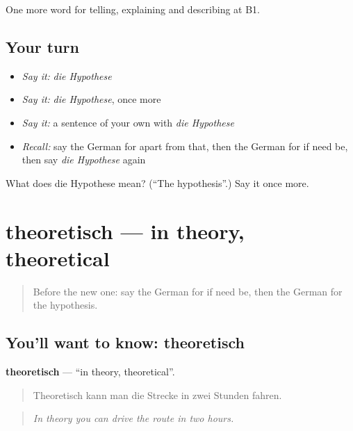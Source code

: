 \begin{grammarlens}[title={What you've built}]
One more word for telling, explaining and describing at B1.
\end{grammarlens}

\subsection*{Your turn}
\begin{itemize}
\raggedright
  \item \emph{Say it:} \emph{die Hypothese}
  \item \emph{Say it:} \emph{die Hypothese}, once more
  \item \emph{Say it:} a sentence of your own with \emph{die Hypothese}
  \item \emph{Recall:} say the German for apart from that, then the German for if need be, then say \emph{die Hypothese} again
\end{itemize}

\begin{tcolorbox}[breakable,colback=teal!4,colframe=teal!35!black,title={Before you move on}]
What does die Hypothese mean? (\textquotedblleft{}The hypothesis\textquotedblright{}.) Say it once more.
\end{tcolorbox}
\section[theoretisch]{theoretisch — in theory, theoretical}

\label{lesson:GE-C366-theoretisch}



\begin{quote}
Before the new one: say the German for if need be, then the German for the hypothesis.
\end{quote}

\subsection*{You'll want to know: theoretisch}
\textbf{theoretisch} — \textquotedblleft{}in theory, theoretical\textquotedblright{}.

\begin{quote}
Theoretisch kann man die Strecke in zwei Stunden fahren.
\end{quote}

\begin{quote}
\emph{In theory you can drive the route in two hours.}
\end{quote}

